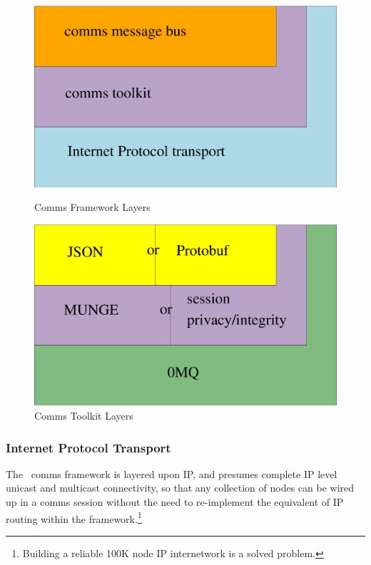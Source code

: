 \begin{figure}
\begin{minipage}[b]{0.45\linewidth}
\centering
\includegraphics[scale=0.30]{../fig/comms.eps}
\caption{Comms Framework Layers}
\label{FigCommsLayers}
\end{minipage}
\hspace{0.5cm}
\begin{minipage}[b]{0.45\linewidth}
\centering
\includegraphics[scale=0.30]{../fig/commstk.eps}
\caption{Comms Toolkit Layers}
\label{FigCommsTK}
\end{minipage}
\end{figure}

\subsubsection{Internet Protocol Transport}

The \ngrm\ comms framework is layered upon IP, and presumes
complete IP level unicast and multicast connectivity, so that any
collection of nodes can be wired up in a comms session without
the need to re-implement the equivalent of IP routing within
the framework.\footnote{Building a reliable 100K node IP internetwork
is a solved problem.}

